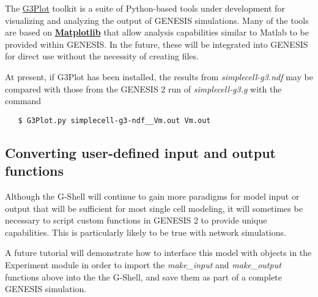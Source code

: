 \documentclass[12pt]{article}
\begin{document}
The \href{../g3plot/g3plot.html}{G3Plot} toolkit is a suite of Python-based tools under development
for visualizing and analyzing the output of GENESIS simulations.  Many of the tools are based on
\href{http://matplotlib.sourceforge.net/}{\bf Matplotlib} that allow analysis capabilities similar
to Matlab to be provided within GENESIS.  In the future, these will be integrated into GENESIS for
direct use without the necessity of creating files.

At present, if G3Plot has been installed, the results from {\it simplecell-g3.ndf} may be compared
with those from the GENESIS 2 run of {\it simplecell-g3.g} with the command
\begin{verbatim}
   $ G3Plot.py simplecell-g3-ndf__Vm.out Vm.out
\end{verbatim}

\subsection*{Converting user-defined input and output functions}

Although the G-Shell will continue to gain more paradigms for model
input or output that will be sufficient for most single cell modeling,
it will sometimes be necessary to script custom functions in GENESIS 2
to provide unique capabilities.  This is particularly likely to be
true with network simulations.

A future tutorial will demonstrate how to interface this model with objects in the Experiment module
in order to import the {\it make\_input} and {\it make\_output} functions above into the the
G-Shell, and save them as part of a complete GENESIS simulation.
\end{document}
